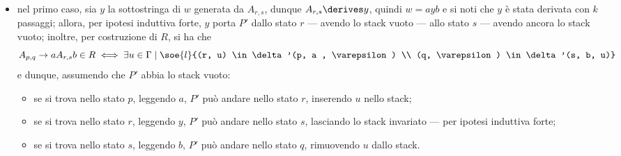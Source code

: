 \documentclass[a4paper, 12pt]{report}
\begin{document}
{\begin{enumerate}[label=]
\begin{enumerate}[label=]
                        \begin{itemize}
                            \item nel primo caso, sia $y$ la sottostringa di $w$ generata da $A_{r,s}$, dunque $A_{r,s} \derives y$, quindi $w = ayb$ e si noti che $y$ è stata derivata con $k$ passaggi; allora, per ipotesi induttiva forte, $y$ porta $P'$ dallo stato $r$ --- avendo lo stack vuoto --- allo stato $s$ --- avendo ancora lo stack vuoto; inoltre, per costruzione di $R$, si ha che $$A_{p,q} \to a A_{r,s}b \in R \iff \exists u \in \Gamma \mid \soe{l}{(r, u) \in \delta'(p, a , \varepsilon) \\ (q, \varepsilon) \in \delta'(s, b, u)}$$ e dunque, assumendo che $P'$ abbia lo stack vuoto:
                                
                                \begin{itemize}
                                    \item se si trova nello stato $p$, leggendo $a$, $P'$ può andare nello stato $r$, inserendo $u$ nello stack;
                                    \item se si trova nello stato $r$, leggendo $y$, $P'$ può andare nello stato $s$, lasciando lo stack invariato --- per ipotesi induttiva forte;
                                    \item se si trova nello stato $s$, leggendo $b$, $P'$ può andare nello stato $q$, rimuovendo $u$ dallo stack.
                                \end{itemize}


\end{itemize}
\end{enumerate}
\end{enumerate}}
\end{document}
